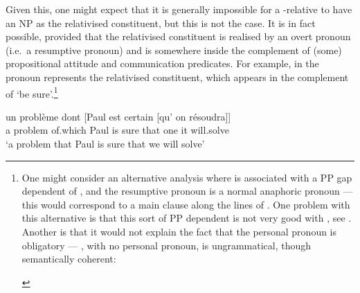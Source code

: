 \documentclass[output=paper,biblatex,babelshorthands,newtxmath,draftmode,colorlinks,citecolor=brown]{langscibook}
\begin{document}
%
Given this, one might expect that it is generally impossible for
a -relative to have an NP as the relativised constituent, but this is not the case. It is in fact possible,
provided that the relativised constituent is
realised by an overt pronoun (i.e.\ a resumptive pronoun) and is somewhere inside the
complement of (some) propositional attitude and communication predicates. For example, in
 the pronoun  represents the relativised constituent, which appears in the complement of  `be sure'.\footnote{One might consider an alternative analysis where 
  is associated with a PP gap dependent of , and the resumptive
  pronoun is a normal anaphoric pronoun --- this would correspond to a main clause along
  the lines of . One problem
  with this alternative is that this sort of PP dependent is not very good
  with , see . Another is that it would not explain the fact
  that the personal pronoun is obligatory --- , with no personal pronoun, is
  ungrammatical, though semantically coherent:
  \begin{exe}
    \ex[*]{\gll
      un problème dont	   [Paul            est certain [que tout va se résoudre]]\\
      a problem   of.which \hphantom{[}Paul is  sure    \hphantom{[}that everything goes itself
      to.solve\\%
}
\label{x:rc-74}
  \end{exe}%
  }
\begin{exe}\ex\label{x:rc-76}
\gll un problème dont	[Paul est certain [qu' on  résoudra]]\\
     a problem   of.which \spacebr Paul  is   sure \spacebr that one it will.solve\\
\glt `a problem that Paul is sure that we will solve'
\end{exe}
\end{document}
